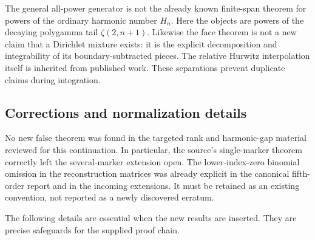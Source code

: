\documentclass[11pt,a4paper]{article}
\numberwithin{equation}{section}
\theoremstyle{definition}
\theoremstyle{remark}
\begin{document}
The general all-power generator is not the already known finite-span
theorem for powers of the ordinary harmonic number $H_n$. Here the
objects are powers of the decaying polygamma tail $\zeta(2,n+1)$.
Likewise the face theorem is not a new claim that a Dirichlet mixture
exists: it is the explicit decomposition and integrability of its
boundary-subtracted pieces. The relative Hurwitz interpolation itself
is inherited from published work. These separations prevent duplicate
claims during integration.

\subsection{Corrections and normalization details}

No new false theorem was found in the targeted rank and harmonic-gap
material reviewed for this continuation. In particular, the source's
single-marker theorem correctly left the several-marker extension open.
The lower-index-zero binomial omission in the reconstruction matrices
was already explicit in the canonical fifth-order report and in the
incoming extensions. It must be retained as an existing convention,
not reported as a newly discovered erratum.

The following details are essential when the new results are inserted.
They are precise safeguards for the supplied proof chain.
\end{document}
